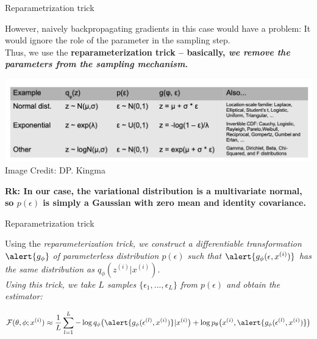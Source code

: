 \documentclass[10pt]{beamer}
\newcommand{\obs}{x^{(i)} }
\newcommand{\alatent}{z^{(i)} }
\begin{document}
\begin{frame}{Reparametrization trick}
 \begin{minipage}[t][.9\textheight]{\textwidth}
 
However, naively backpropagating gradients in this case would have a problem:  \pause It would ignore the role of the parameter in the sampling step.  \pause \\
\vfill 
Thus, we use the \bf{reparameterization trick}  -- basically, \it{we remove the parameters from the sampling mechanism}. \pause

\begin{center}
\includegraphics[width=.9\textwidth]{images/reparametrization_trick}
\vfill \hfill \tiny Image Credit: DP. Kingma 
\end{center}

\vfill
\pause \tiny \bf{Rk}:  In our case, the variational distribution is a multivariate normal, so $p(\epsilon)$ is simply a Gaussian with zero mean and identity covariance.

\end{minipage}

\end{frame}


\begin{frame}{Reparametrization trick}

Using the \it{reparameterization trick}, we construct a differentiable transformation $\alert{g_\phi}$ of parameterless distribution $p(\epsilon)$ such that $\alert{g_\phi(\epsilon, \obs)}$ has the same distribution as $q_\phi(\alatent| x^{(i)})$. \\
\vfill 
 Using this trick, we take $L$ samples $\{\epsilon_1, ..., \epsilon_L \}$ from $p(\epsilon)$ and obtain the estimator: 

\begin{equation}
\label{vae_sgvb}
 \mathcal{F}(\theta, \phi; x^{(i)}) \approx \df{1}{L} \ds\sum_{l=1}^L - \log q_\phi \big(\alert{g_\phi(\epsilon^{(l)}, x^{(i)})} | x^{(i)} \big) + \log p_\theta \big( x^{(i)}, \alert{g_\phi(\epsilon^{(l)}, x^{(i)})} \big) 
\end{equation} 

\end{frame}
\end{document}
